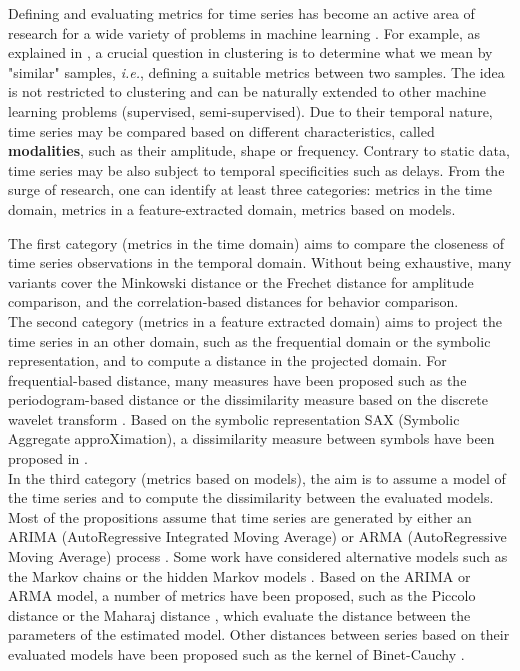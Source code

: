 Defining and evaluating metrics for time series has become an active area of research for a wide variety of problems in machine learning \cite{Ding2008, Najmeddine2012}. For example, as explained in \cite{Montero2014}, a crucial question in clustering is to determine what we mean by "similar" samples, \textit{i.e.}, defining a suitable metrics between two samples. The idea is not restricted to clustering and can be naturally extended to other machine learning problems (supervised, semi-supervised).
Due to their temporal nature, time series may be compared based on different characteristics, called \textbf{modalities}, such as their amplitude, shape or frequency. Contrary to static data, time series may be also subject to temporal specificities such as delays. From the surge of research, one can identify at least three categories: metrics in the time domain, metrics in a feature-extracted domain, metrics based on models.

The first category (metrics in the time domain) aims to compare the closeness of time series observations in the temporal domain. Without being exhaustive, many variants cover the Minkowski distance or the Frechet distance \cite{Maurice1906} for amplitude comparison, and the correlation-based distances \cite{Douzal-Chouakria2003,AhlameDouzal-Chouakria2012,Chouakria2007,Benesty2009}for behavior comparison. \\
The second category (metrics in a feature extracted domain) aims to project the time series in an other domain, such as the frequential domain or the symbolic representation, and to compute a distance in the projected domain. For frequential-based distance, many measures have been proposed such as the periodogram-based distance \cite{Caiado2006c} or the dissimilarity measure based on the discrete wavelet transform \cite{Chan2008}. Based on the symbolic representation SAX (Symbolic Aggregate approXimation), a dissimilarity measure between symbols have been proposed in \cite{Lin2003b}. \\
In the third category (metrics based on models), the aim is to assume a model of the time series and to compute the dissimilarity between the evaluated models. Most of the propositions assume that time series are generated by either an ARIMA (AutoRegressive Integrated Moving Average) or ARMA (AutoRegressive Moving Average) process \cite{Kalpakis,Martin2000}. Some work have considered alternative models such as the Markov chains \cite{Ramoni2002} or the hidden Markov models \cite{Smyth1997}. Based on the ARIMA or ARMA model, a number of metrics have been proposed, such as the Piccolo distance \cite{Piccolo1990} or the Maharaj distance \cite{Maharaj1996}, which evaluate the distance between the parameters of the estimated model. Other distances between series based on their evaluated models have been proposed such as the kernel of  Binet-Cauchy \cite{Vishwanathan2007}.

